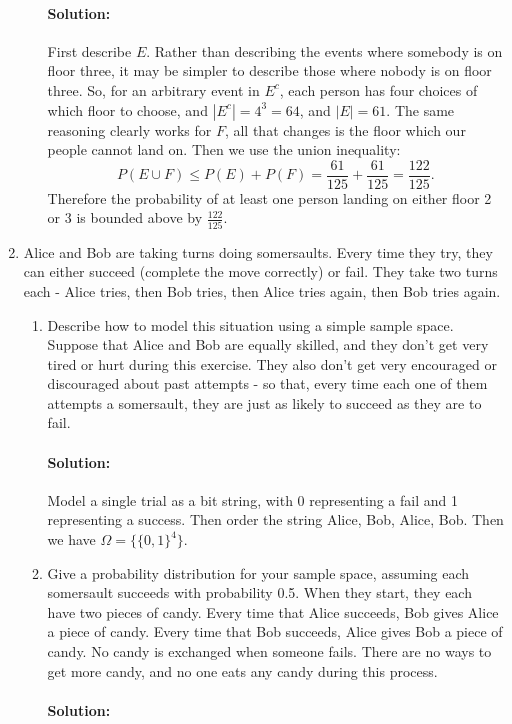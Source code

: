 \documentclass{article}
\begin{document}
\begin{enumerate}
\begin{enumerate}
                \paragraph{Solution: }First describe $E$. Rather than describing the events where somebody is on floor three, it may be simpler to describe those where nobody is on floor three. So, for an arbitrary event in $E^{c}$, each person has four choices of which floor to choose, and $|E^{c}|=4^3=64$, and $|E|=61$. The same reasoning clearly works for $F$, all that changes is the floor which our people cannot land on. Then we use the union inequality:
                    \[
                        P(E\cup F)\leq P(E)+P(F)=\frac{61}{125}+\frac{61}{125}=\frac{122}{125}
                    .\] 
                    Therefore the probability of at least one person landing on either floor 2 or 3 is bounded above by $\frac{122}{125}$.
        \end{enumerate}
\item Alice and Bob are taking turns doing somersaults. Every time they try, they can either succeed (complete the move correctly) or fail. They take two turns each - Alice tries, then Bob tries, then Alice tries again, then Bob tries again.
\begin{enumerate}
    \item Describe how to model this situation using a simple sample space. Suppose that Alice and Bob are equally skilled, and they don't get very tired or hurt during this exercise. They also don't get very encouraged or discouraged about past attempts - so that, every time each one of them attempts a somersault, they are just as likely to succeed as they are to fail.
        \paragraph{Solution: }Model a single trial as a bit string, with 0 representing a fail and 1 representing a success. Then order the string Alice, Bob, Alice, Bob. Then we have $\Omega=\{\{ 0,1\}^{4}\} $.
    \item Give a probability distribution for your sample space, assuming each somersault succeeds with probability 0.5. When they start, they each have two pieces of candy. Every time that Alice succeeds, Bob gives Alice a piece of candy. Every time that Bob succeeds, Alice gives Bob a piece of candy. No candy is exchanged when someone fails. There are no ways to get more candy, and no one eats any candy during this process.
        \paragraph{Solution: }


\end{enumerate}
\end{enumerate}
\end{document}
